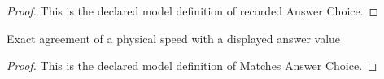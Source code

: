 \begin{proof}
  This is the declared model definition of recorded Answer Choice.
\end{proof}
\begin{definition}
  \label{def:physics:phyx-mini-0183:phyxminiproblems-problemphyxmini0183-matchesanswerchoice}
  Exact agreement of a physical speed with a displayed answer value
\end{definition}
\begin{proof}
  This is the declared model definition of Matches Answer Choice.
\end{proof}
